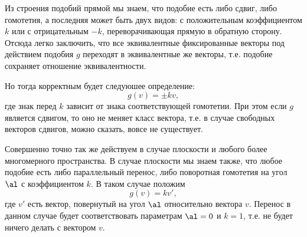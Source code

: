 \begin{enumerate}
Из строения подобий прямой мы знаем, что подобие есть либо сдвиг, либо гомотетия, а последняя может быть двух видов: с положительным коэффициентом $k$ или с отрицательным $-k$, переворачивающая прямую в обратную сторону. Отсюда легко заключить, что все эквивалентные фиксированные векторы под действием подобия $g$ переходят в эквивалентные же векторы, т.е. подобие сохраняет отношение эквивалентности.

Но тогда корректным будет следуюшее определение:
$$
g(v)=\pm kv,
$$
где знак перед $k$ зависит от знака соответствующей гомотетии. При этом если $g$ является сдвигом, то оно не меняет класс вектора, т.е. в случае свободных векторов сдвигов, можно сказать, вовсе не существует.

Совершенно точно так же действуем в случае плоскости и любого более многомерного пространства. В случае плоскости мы знаем также, что любое подобие есть либо параллельный перенос, либо поворотная гомотетия на угол $\al$ с коэффициентом $k$. В таком случае положим
$$
g(v)=kv',
$$
где $v'$ есть вектор, повернутый на угол $\al$ относительно вектора $v$. Перенос в данном случае будет соответствовать параметрам $\al=0$ и $k=1$, т.е. не будет ничего делать с вектором $v$.


\end{enumerate}
